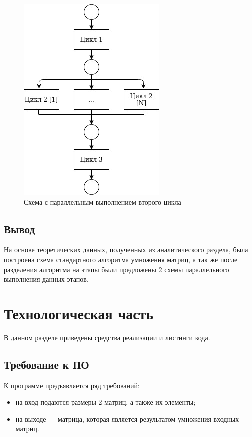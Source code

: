 \documentclass[12pt]{report}
\begin{document}
\begin{figure}[h]
	\centering
	\includegraphics[scale=0.7]{parallel_scheme_02.jpg}
	\caption{Схема с параллельным выполнением второго цикла}
	\label{fig:mpr}
\end{figure}



\section{Вывод}
На основе теоретических данных, полученных из аналитического раздела, была построена схема стандартного алгоритма умножения матриц, а так же после разделения алгоритма на этапы были предложены 2 схемы параллельного выполнения данных этапов.

\chapter{Технологическая часть}

В данном разделе приведены средства реализации и листинги кода.

\section{Требование к ПО}

К программе предъявляется ряд требований:

\begin{itemize}
	\item на вход подаются размеры 2 матриц, а также их элементы;
	\item на выходе — матрица, которая является результатом умножения входных матриц.
\end{itemize}
\end{document}
